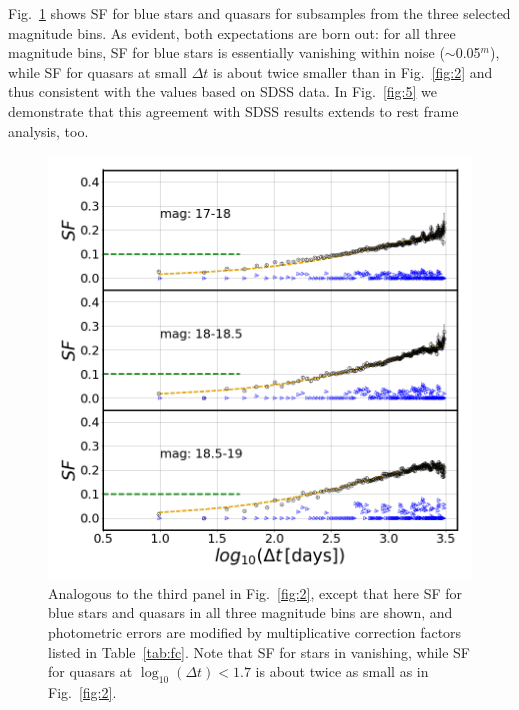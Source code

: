 \documentclass[fleqn,usenatbib]{mnras}
\begin{document}
Fig.~\ref{fig:4} shows SF for blue stars and quasars for subsamples from the three selected magnitude bins. 
As evident, both expectations are born out: for all three magnitude bins, SF for blue stars is essentially 
vanishing within noise ($\sim$0.05$^m$), while SF for quasars at small $\Delta t$ is about twice smaller 
than in Fig.~\ref{fig:2} and thus consistent with the values based on SDSS data. In Fig.~\ref{fig:5} we 
demonstrate that this agreement with SDSS results extends to rest frame analysis, too. 

\begin{figure}
\vskip -0.15in
\includegraphics[width=1.1\columnwidth, center]{Fig_4.png}
\caption{Analogous to the third panel in Fig.~\ref{fig:2}, except that here SF for blue stars and quasars in
all three magnitude bins are shown, and photometric errors are modified by multiplicative correction factors 
listed in Table~\ref{tab:fc}. Note that SF for stars in vanishing, while SF for quasars at $\log_{10}(\Delta t) < 1.7$  
is about twice as small as in Fig.~\ref{fig:2}.} 
\label{fig:4}
\end{figure}
\end{document}
